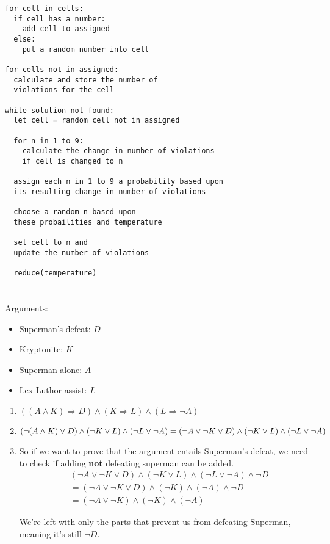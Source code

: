 \documentclass[12pt]{article}
\begin{document}
\begin{enumerate}[label={\large\textbf{\alph*)}}]
\begin{verbatim}
for cell in cells:
  if cell has a number:
    add cell to assigned
  else:
    put a random number into cell

for cells not in assigned:
  calculate and store the number of
  violations for the cell

while solution not found:
  let cell = random cell not in assigned

  for n in 1 to 9:
    calculate the change in number of violations
    if cell is changed to n

  assign each n in 1 to 9 a probability based upon
  its resulting change in number of violations

  choose a random n based upon
  these probailities and temperature

  set cell to n and
  update the number of violations

  reduce(temperature)
\end{verbatim}
\end{enumerate}

\pagebreak
\section{}
Arguments:
\begin{itemize}
\item Superman's defeat: $D$
\item Kryptonite: $K$
\item Superman alone: $A$
\item Lex Luthor assist: $L$
\end{itemize}

\begin{enumerate}[label={\large\textbf{\alph*)}}]
\item $((A \land K) \Rightarrow D) \land (K \Rightarrow L) \land (L \Rightarrow \neg A)$

\item
$(\neg(A \land K) \lor D) \land (\neg K \lor L) \land (\neg L \lor \neg A) \\
= (\neg A \lor \neg K \lor D) \land (\neg K \lor L) \land (\neg L \lor \neg A)$


\item
So if we want to prove that the argument entails Superman's defeat,
we need to check if adding \textbf{not} defeating superman can be added.
\begin{align*}
& (\neg A \lor \neg K \lor D) \land (\neg K \lor L) \land (\neg L \lor \neg A) \land \neg D \\
& =(\neg A \lor \neg K \lor D) \land (\neg K) \land (\neg A) \land \neg D \\
&= (\neg A \lor \neg K) \land (\neg K) \land (\neg A)
\end{align*}

We're left with only the parts that prevent us from defeating Superman, meaning it's still $\neg D$.
\end{enumerate}
\end{document}
